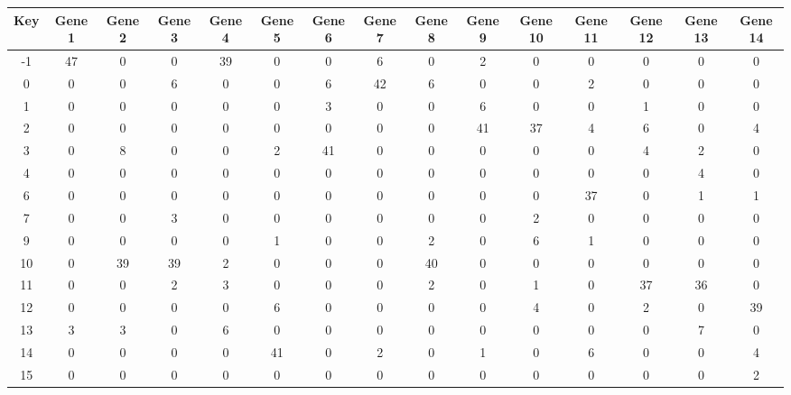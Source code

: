 \begin{tabular}{|c|c|c|c|c|c|c|c|c|c|c|c|c|c|c|}
\hline
Key & Gene 1 & Gene 2 & Gene 3 & Gene 4 & Gene 5 & Gene 6 & Gene 7 & Gene 8 & Gene 9 & Gene 10 & Gene 11 & Gene 12 & Gene 13 & Gene 14 \\
\hline
-1 & 47 & 0 & 0 & 39 & 0 & 0 & 6 & 0 & 2 & 0 & 0 & 0 & 0 & 0 \\
0 & 0 & 0 & 6 & 0 & 0 & 6 & 42 & 6 & 0 & 0 & 2 & 0 & 0 & 0 \\
1 & 0 & 0 & 0 & 0 & 0 & 3 & 0 & 0 & 6 & 0 & 0 & 1 & 0 & 0 \\
2 & 0 & 0 & 0 & 0 & 0 & 0 & 0 & 0 & 41 & 37 & 4 & 6 & 0 & 4 \\
3 & 0 & 8 & 0 & 0 & 2 & 41 & 0 & 0 & 0 & 0 & 0 & 4 & 2 & 0 \\
4 & 0 & 0 & 0 & 0 & 0 & 0 & 0 & 0 & 0 & 0 & 0 & 0 & 4 & 0 \\
6 & 0 & 0 & 0 & 0 & 0 & 0 & 0 & 0 & 0 & 0 & 37 & 0 & 1 & 1 \\
7 & 0 & 0 & 3 & 0 & 0 & 0 & 0 & 0 & 0 & 2 & 0 & 0 & 0 & 0 \\
9 & 0 & 0 & 0 & 0 & 1 & 0 & 0 & 2 & 0 & 6 & 1 & 0 & 0 & 0 \\
10 & 0 & 39 & 39 & 2 & 0 & 0 & 0 & 40 & 0 & 0 & 0 & 0 & 0 & 0 \\
11 & 0 & 0 & 2 & 3 & 0 & 0 & 0 & 2 & 0 & 1 & 0 & 37 & 36 & 0 \\
12 & 0 & 0 & 0 & 0 & 6 & 0 & 0 & 0 & 0 & 4 & 0 & 2 & 0 & 39 \\
13 & 3 & 3 & 0 & 6 & 0 & 0 & 0 & 0 & 0 & 0 & 0 & 0 & 7 & 0 \\
14 & 0 & 0 & 0 & 0 & 41 & 0 & 2 & 0 & 1 & 0 & 6 & 0 & 0 & 4 \\
15 & 0 & 0 & 0 & 0 & 0 & 0 & 0 & 0 & 0 & 0 & 0 & 0 & 0 & 2 \\
\hline
\end{tabular}